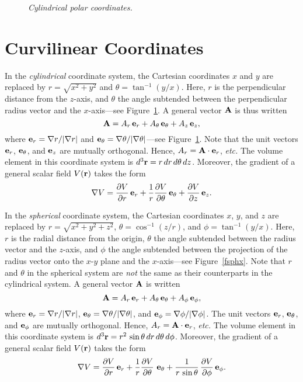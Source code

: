 \begin{figure}
\epsfysize=2.75in
\centerline{}
\caption{\em Cylindrical polar coordinates.}\label{fcyl}
\end{figure}

\section{Curvilinear Coordinates}\label{spolar}
In the {\em cylindrical}\/ coordinate system, the Cartesian coordinates $x$ and
$y$ are replaced by $r=\sqrt{x^2+y^2}$ and $\theta=\tan^{-1}(y/x)$.
Here, $r$ is the perpendicular distance from the $z$-axis, and $\theta$
the angle subtended between the perpendicular radius vector and the $x$-axis---see
Figure~\ref{fcyl}. A general  vector ${\bf A}$ is thus written
\begin{equation}
{\bf A} = A_r\,{\bf e}_r+ A_\theta\,{\bf e}_\theta + A_z\,{\bf e}_z,
\end{equation}
where ${\bf e}_r=\nabla r/|\nabla r|$ and ${\bf e}_\theta = \nabla\theta/|\nabla\theta|$---see Figure~\ref{fcyl}. Note that the unit vectors
${\bf e}_r$, ${\bf e}_\theta$, and ${\bf e}_z$ are mutually orthogonal.
Hence, $A_r = {\bf A}\cdot {\bf e}_r$, {\em etc.} The
volume element in this coordinate system is $d^3{\bf r} = r\,dr\,d\theta\,dz$. 
Moreover, the gradient of a general scalar field $V({\bf r})$ takes the form
\begin{equation}
\nabla V = \frac{\partial V}{\partial r}\,{\bf e}_r
+ \frac{1}{r}\frac{\partial V}{\partial\theta}\,{\bf e}_\theta
+ \frac{\partial V}{\partial z}\,{\bf e}_z.
\end{equation}

In the {\em spherical}\/ coordinate system, the Cartesian coordinates
$x$, $y$, and $z$
are replaced by $r=\sqrt{x^2+y^2+z^2}$, $\theta = \cos^{-1}(z/r)$,
and $\phi=\tan^{-1}(y/x)$. Here, $r$ is the radial distance from the origin,
$\theta$ the angle subtended between the radius vector and the $z$-axis,
and $\phi$ the angle subtended between the projection of the radius vector
onto the $x$-$y$ plane and the $x$-axis---see Figure~\ref{fsphx}.
Note that $r$ and $\theta$ in the spherical system are {\em not}\/ the same as their counterparts in the cylindrical system.
A general vector ${\bf A}$ is written
\begin{equation}
{\bf A} = A_r\,{\bf e}_r + A_\theta\,{\bf e}_\theta+ A_\phi\,{\bf e}_\phi,
\end{equation}
where ${\bf e}_r=\nabla r/|\nabla r|$, ${\bf e}_\theta = \nabla\theta/|\nabla\theta|$, and ${\bf e}_\phi = \nabla\phi/|\nabla\phi|$. The unit
vectors ${\bf e}_r$, ${\bf e}_\theta$, and ${\bf e}_\phi$ are mutually
orthogonal. Hence, $A_r = {\bf A}\cdot{\bf e}_r$, {\em etc.}
The
volume element in this coordinate system is $d^3{\bf r} = r^2\,\sin\theta\,dr\,d\theta\,d\phi$. 
Moreover, the gradient of a general scalar field $V({\bf r})$ takes the form
\begin{equation}
\nabla V = \frac{\partial V}{\partial r}\,{\bf e}_r
+ \frac{1}{r}\frac{\partial V}{\partial\theta}\,\,{\bf e}_\theta
+ \frac{1}{r\,\sin\theta}\,\frac{\partial V}{\partial \phi}\,{\bf e}_\phi.
\end{equation}

